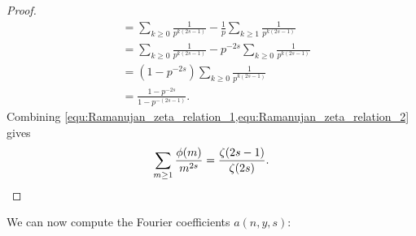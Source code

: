 \begin{proof}
\begin{equation}
\begin{aligned}
            &= \sum_{k \ge 0}\frac{1}{p^{k(2s-1)}}-\frac{1}{p}\sum_{k \ge 1}\frac{1}{p^{k(2s-1)}} \\
            &= \sum_{k \ge 0}\frac{1}{p^{k(2s-1)}}-p^{-2s}\sum_{k \ge 0}\frac{1}{p^{k(2s-1)}} \\
            &= (1-p^{-2s})\sum_{k \ge 0}\frac{1}{p^{k(2s-1)}} \\
            &= \frac{1-p^{-2s}}{1-p^{-(2s-1)}}.
          \end{aligned}
        \end{equation}
        Combining \cref{equ:Ramanujan_zeta_relation_1,equ:Ramanujan_zeta_relation_2} gives
        \[
          \sum_{m \ge 1}\frac{\phi(m)}{m^{2s}} = \frac{\zeta(2s-1)}{\zeta(2s)}.
        \]
      \end{proof}

      We can now compute the Fourier coefficients $a(n,y,s)$:

